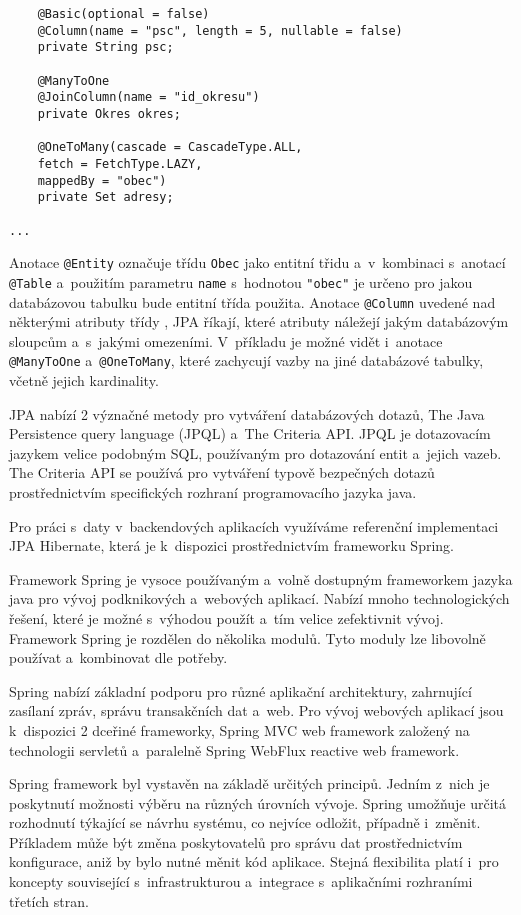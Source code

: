 \documentclass[twoside, 12pt]{article}
\begin{document}
{\begin{lstlisting}
    @Basic(optional = false)
    @Column(name = "psc", length = 5, nullable = false)
    private String psc;

    @ManyToOne
    @JoinColumn(name = "id_okresu")
    private Okres okres;

    @OneToMany(cascade = CascadeType.ALL,
    fetch = FetchType.LAZY,
    mappedBy = "obec")
    private Set adresy;

...

\end{lstlisting}

Anotace \texttt{@Entity} označuje třídu \texttt{Obec}
jako entitní třidu a~v~kombinaci s~anotací \texttt{@Table}
a~použitím parametru \texttt{name} s~hodnotou \texttt{"obec"}
je určeno pro jakou databázovou tabulku bude entitní třída použita.
Anotace \texttt{@Column} uvedené nad některými atributy třídy ,
JPA říkají, které atributy náležejí jakým databázovým sloupcům a~s~jakými omezeními.
V~příkladu je možné vidět i~anotace \texttt{@ManyToOne} a~\texttt{@OneToMany},
které zachycují vazby na jiné databázové tabulky, včetně jejich kardinality.

JPA nabízí 2 význačné metody pro vytváření databázových dotazů,
The Java Persistence query language (JPQL) a~The Criteria API.
JPQL je dotazovacím jazykem velice podobným SQL, používaným pro dotazování
entit a~jejich vazeb.
The Criteria API se používá pro vytváření typově bezpečných dotazů
prostřednictvím specifických rozhraní programovacího jazyka java.
\cite{oracleJPA}

Pro práci s~daty v~backendových aplikacích využíváme referenční implementaci
JPA Hibernate, která je k~dispozici prostřednictvím frameworku Spring.


Framework Spring je vysoce používaným a~volně dostupným frameworkem
jazyka java pro vývoj podknikových a~webových aplikací.
Nabízí mnoho technologických řešení, které je možné s~výhodou
použít a~tím velice zefektivnit vývoj.
Framework Spring je rozdělen do několika modulů.
Tyto moduly lze libovolně používat a~kombinovat dle potřeby.

Spring nabízí základní podporu pro různé aplikační architektury,
zahrnující zasílaní zpráv, správu transakčních dat a~web.
Pro vývoj webových aplikací jsou k~dispozici 2 dceřiné frameworky,
Spring MVC web framework založený na technologii servletů
a~paralelně Spring WebFlux reactive web framework.

Spring framework byl vystavěn na základě určitých principů.
Jedním z~nich je poskytnutí možnosti výběru na různých úrovních vývoje.
Spring umožňuje určitá rozhodnutí týkající se návrhu systému,
co nejvíce odložit, případně i~změnit.
Příkladem může být změna poskytovatelů
pro správu dat prostřednictvím konfigurace,
aniž by bylo nutné měnit kód aplikace.
Stejná flexibilita platí i~pro koncepty související s~infrastrukturou
a~integrace s~aplikačními rozhraními třetích stran.

}
\end{document}
